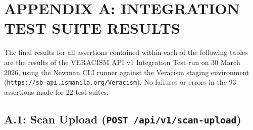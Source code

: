 
\section{APPENDIX A: INTEGRATION TEST SUITE RESULTS}
\label{appendix:integration-tests}

The final results for all assertions contained within each of the following tables are the results of the VERACISM API v1 Integration Test run on 30 March 2026, using the Newman CLI runner against the Veracism staging environment
(\texttt{https://sb-api.ismanila.org/Veracism}). No failures or errors in the 93 assertions made for 22 test suites.

\subsection*{A.1: Scan Upload (\texttt{POST /api/v1/scan-upload})}

